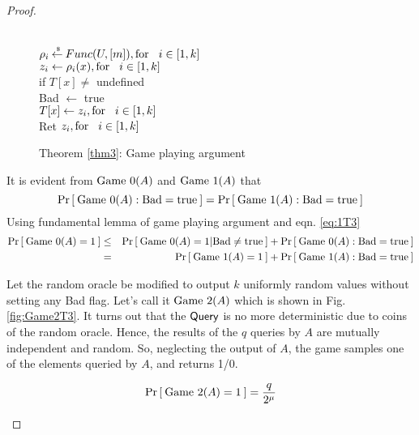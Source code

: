 \begin{proof}
\begin{figure}
{{\medskip
{}\\
$\rho_i {\:\stackrel{{\scriptscriptstyle \hspace{0.2em}\$}} {\leftarrow}\:} Func(U,[m]), \mathrm{for} \hspace*{2ex} i \in [1,k]$\\
$z_{i} \gets \rho_i(x), \mathrm{for} \hspace*{2ex} i \in [1,k]$\\
if $T[x] \neq $ undefined\\
\nudge Bad $\gets$ true\\
$\\T[x] \gets z_i, \mathrm{for} \hspace*{2ex} i \in [1,k]$\\
Ret $z_i, \mathrm{for} \hspace*{2ex} i \in [1,k]$
}
}
\caption{Theorem \ref{thm3}: Game playing argument}\label{fig:GameT3}
\end{figure}
It is evident from $\text{Game 0}(A)$ and $\text{Game 1}(A)$ that 
\begin{equation}
\Pr\left[\: \text{Game 0}(A) : \mathrm{Bad}=\mathrm{true} \:\right] = \Pr\left[\: \text{Game 1}(A) : \mathrm{Bad}=\mathrm{true} \:\right]\label{eq:1T3}
\end{equation}
Using fundamental lemma of game playing argument and eqn. \ref{eq:1T3}
\begin{eqnarray}
\nonumber \Pr\left[\: \text{Game 0}(A)=1 \:\right] & \leq & \Pr\left[\: \text{Game 0}(A)=1 | \mathrm{Bad} \neq \mathrm{true} \:\right] + \Pr\left[\: \text{Game 0}(A) : \mathrm{Bad}=\mathrm{true} \:\right]\\
&=& \Pr\left[\: \text{Game 1}(A)=1 \:\right] + \Pr\left[\: \text{Game 1}(A) : \mathrm{Bad}=\mathrm{true} \:\right]\label{eq:2T3}
\end{eqnarray}

Let the random oracle be modified to output $k$ uniformly random values without setting any Bad flag. Let's call it $\text{Game 2}(A)$ which is shown in Fig. \ref{fig:Game2T3}. It turns out that the  $\mathsf{Query}$ is no more deterministic due to coins of the random oracle. Hence, the results of the $q$ queries by $A$ are mutually independent and random. So, neglecting the output of $A$, the game samples one of the elements queried by $A$, and returns 1/0. 

\begin{equation}
\Pr\left[\: \text{Game 2}(A)=1 \:\right] = \frac{q}{2^\mu}\label{eq:3T3}
\end{equation}

\begin{figure}
\centering
{}
\end{figure}
\end{proof}
